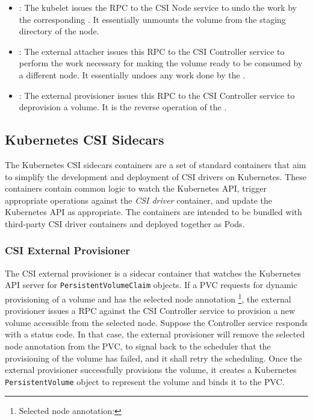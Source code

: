 \begin{itemize}
      \item{}: The kubelet issues the RPC to the CSI Node
            service to undo the work by the corresponding .
            It essentially unmounts the volume from the staging directory of the
            node.

      \item{}: The external attacher issues this
            RPC to the CSI Controller service to perform the work necessary for
            making the volume ready to be consumed by a different node. It
            essentially undoes any work done by the
            .

      \item{}: The external provisioner issues this RPC to the
            CSI Controller service to deprovision a volume. It is the reverse
            operation of the .

\end{itemize}


\subsection{Kubernetes CSI Sidecars}
The Kubernetes CSI sidecars containers are a set of standard containers that aim
to simplify the development and deployment of CSI drivers on Kubernetes. These
containers contain common logic to watch the Kubernetes API, trigger appropriate
operations against the \textit{CSI driver} container, and update the Kubernetes
API as appropriate. The containers are intended to be bundled with third-party
CSI driver containers and deployed together as Pods.



\subsubsection{CSI External Provisioner}
\label{csi-external-provisioner}
\label{section:provisioner}

The CSI external provisioner is a sidecar container that watches the Kubernetes
API server for \texttt{PersistentVolumeClaim} objects. If a PVC requests for
dynamic provisioning of a volume and has the selected node annotation
\footnote{Selected node annotation: }, the external provisioner issues a  RPC against
the CSI Controller service to provision a new volume accessible from the
selected node. Suppose the Controller service responds with a
 status code. In that case, the external provisioner will
remove the selected node annotation from the PVC, to signal back to the
scheduler that the provisioning of the volume has failed, and it shall retry the
scheduling. Once the external provisioner successfully provisions the volume, it
creates a Kubernetes \texttt{PersistentVolume} object to represent the volume
and binds it to the PVC.

